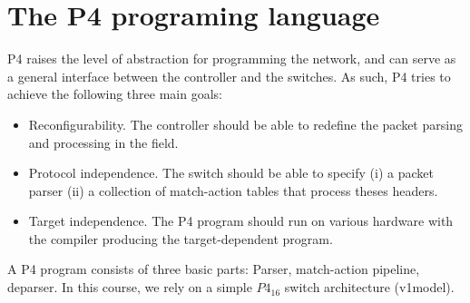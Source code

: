 \documentclass[11pt,oneside,a4paper]{article}
\begin{document}
\section{The P4 programing language}

P4 raises the level of abstraction for programming the network, and can serve as a general interface between the controller and the switches. As such, P4 tries to achieve the following three main goals:
\vspace{-\topsep}
\begin{itemize}
	\setlength{\itemsep}{0pt}
	\setlength{\parskip}{0pt}
	\item Reconfigurability. The controller should be able to redefine the packet parsing and processing in the field.
	\item Protocol independence. The switch should be able to specify (i) a packet parser (ii) a collection of match-action tables that process theses headers.
	\item Target independence. The P4 program should run on various hardware with the compiler producing the target-dependent program.
\end{itemize}
\vspace{-\topsep}

\noindent A P4 program consists of three basic parts: Parser, match-action pipeline, deparser. In this course, we rely on a simple $P4_{16}$ switch architecture (v1model).
\end{document}

